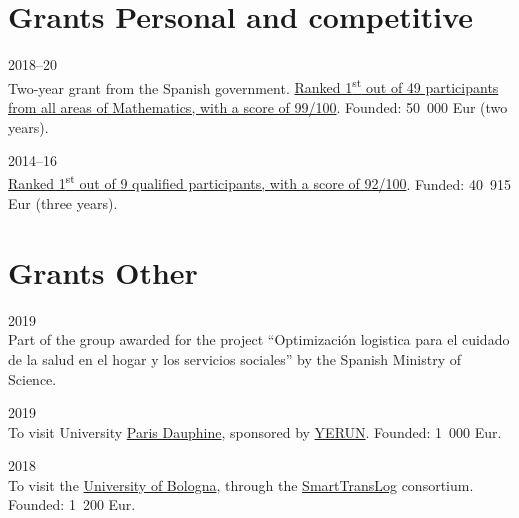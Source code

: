 \section*{Grants {\small Personal and competitive}}

\begin{paracol}{2}
  \textsc{2018--20}
\switchcolumn
  \\
  Two-year grant from the Spanish government.
  \href{https://santini.in/files/cv/jdc17.pdf}{Ranked 1\textsuperscript{st} out of 49 participants from all areas of Mathematics, with a score of 99/100}.
  Founded: 50~000 Eur (two years).
\end{paracol}

\begin{paracol}{2}
  \textsc{2014--16}
\switchcolumn
  \\
  \href{https://santini.in/files/cv/phd14.pdf}{Ranked 1\textsuperscript{st} out of 9 qualified participants, with a score of 92/100}.
  Funded: 40~915 Eur (three years).
\end{paracol}

\section*{Grants {\small Other}}

\begin{paracol}{2}
  \textsc{2019}
\switchcolumn
  \\
  Part of the group awarded for the project ``Optimización logistica para el cuidado de la salud en el hogar y los servicios sociales'' by the Spanish Ministry of Science.
\end{paracol}

\begin{paracol}{2}
  \textsc{2019}
\switchcolumn
  \\
  To visit University \href{https://www.dauphine.psl.eu/}{Paris Dauphine}, sponsored by \href{https://www.yerun.eu}{YERUN}.
  Founded: 1~000 Eur.
\end{paracol}

\begin{paracol}{2}
  \textsc{2018}
\switchcolumn
  \\
  To visit the \href{https://www.unibo.it/}{University of Bologna}, through the \href{https://smarttranslog.wordpress.com/}{SmartTransLog} consortium.
  Founded: 1~200 Eur.
\end{paracol}

